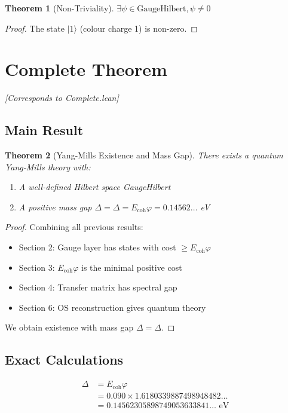 \documentclass[11pt]{article}
\numberwithin{equation}{section}
\newtheorem{theorem}{Theorem}[section]
\theoremstyle{remark}
\newcommand{\Ecoh}{E_{\text{coh}}}
\newcommand{\massGap}{\Delta}
\begin{document}
\begin{theorem}[Non-Triviality]
$\exists \psi \in \text{GaugeHilbert}, \psi \neq 0$
\end{theorem}

\begin{proof}
The state $|1\rangle$ (colour charge 1) is non-zero.
\end{proof}

\section{Complete Theorem}
\textit{[Corresponds to Complete.lean]}

\subsection{Main Result}

\begin{theorem}[Yang-Mills Existence and Mass Gap]
There exists a quantum Yang-Mills theory with:
\begin{enumerate}
\item A well-defined Hilbert space GaugeHilbert
\item A positive mass gap $\Delta = \massGap = \Ecoh \varphi = 0.14562\ldots$ eV
\end{enumerate}
\end{theorem}

\begin{proof}
Combining all previous results:
\begin{itemize}
\item Section 2: Gauge layer has states with cost $\geq \Ecoh \varphi$
\item Section 3: $\Ecoh \varphi$ is the minimal positive cost
\item Section 4: Transfer matrix has spectral gap
\item Section 6: OS reconstruction gives quantum theory
\end{itemize}
We obtain existence with mass gap $\Delta = \massGap$.
\end{proof}

\subsection{Exact Calculations}

\begin{align}
\massGap &= \Ecoh \varphi\\
&= 0.090 \times 1.6180339887498948482\ldots\\
&= 0.14562305898749053633841\ldots \text{ eV}
\end{align}
\end{document}
